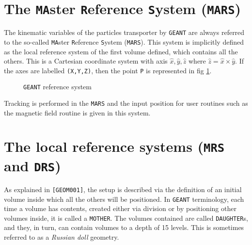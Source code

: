            
           
\section{The {\tt MA}ster {\tt R}eference {\tt S}ystem ({\tt MARS})}
 
The kinematic variables of the particles transporter by {\tt GEANT}
are always referred to the so-called 
{\tt MA}ster {\tt R}eference {\tt S}ystem ({\tt MARS}). This system
is implicitly defined as the local reference system of the first
volume defined, which contains all the others. This is a Cartesian
coordinate system with axis $\hat{x}, \hat{y}, \hat{z}$ where
$\hat{z} = \hat{x} \times \hat{y}$.
If the axes are labelled {\tt (X,Y,Z)}, then the point {\tt P}
is represented in fig \ref{fg:base090-1}.
 
\begin{figure}[hbt]
      \centering
      \caption{{\tt GEANT} reference system}
      \label{fg:base090-1}
\end{figure}

Tracking is performed in the {\tt MARS} and the input position for
user routines such as the magnetic field routine is given in this
system.

\section{The local reference systems ({\tt MRS} and {\tt DRS})}
 
As explained in {\tt [GEOM001]}, the setup is
described via the definition of an initial volume inside which all
the others will be positioned. In {\tt GEANT} terminology, each time
a volume has contents, created either via division or by positioning 
other volumes inside, it is called a {\tt MOTHER}. The volumes contained
are called {\tt DAUGHTER}s, and they, in turn, can contain volumes to
a depth of 15 levels. This is sometimes referred to as a {\it Russian doll}
geometry.
 
